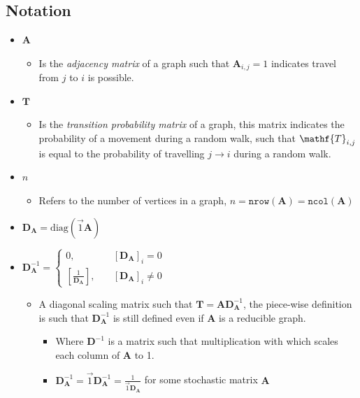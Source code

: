 \documentclass[11pt]{report}
\begin{document}
\subsection{Notation}
\label{notation}
\begin{itemize}
\item \(\mathbf{A}\)
\begin{itemize}
\item Is the \emph{adjacency matrix} of a graph such that \(\mathbf{A}_{i,j} = 1\) indicates travel from \(j\) to \(i\) is possible.
\end{itemize}
\item \(\mathbf{T}\)
\begin{itemize}
\item Is the \emph{transition probability matrix} of a graph, this matrix indicates the probability of a movement during a random walk, such that \(\mathf{T}_{i,j}\) is equal to the probability of travelling \(j \rightarrow  i\) during a random walk.
\end{itemize}
\item \(n\)
\begin{itemize}
\item Refers to the number of vertices in a graph, \(n = \mathtt{nrow}\left(\mathbf{A}\right) = \mathtt{ncol}\left(\mathbf{A}\right)\)
\end{itemize}
\item \(\mathbf{D}_{\mathbf{A}}=\mathrm{diag}\left(\vec{1}\mathbf{A}\right)\)
\item \(\mathbf{D}_{\mathbf{A}}^{- 1}  =
   \begin{cases}
   0 ,& \quad \left[ \mathbf{D}_{\mathbf{A}} \right]_i = 0 \\
   \left[ \frac{1}{\mathbf{D}_{\mathbf{A}}} \right] ,& \enspace \enspace \left[ \mathbf{D}_{\mathbf{A}} \right]_i \neq 0
   \end{cases}\)
\begin{itemize}
\item A diagonal scaling matrix such that \(\mathbf{T} = \mathbf{A} \mathbf{D}_{\mathbf{A}}^{-1}\), the piece-wise definition is such that \(\mathbf{D}^{-1}_{\mathbf{A}}\) is still defined even if \(\mathbf{A}\) is a reducible graph.
\begin{itemize}
\item Where \(\mathbf{D}^{-1}\) is a matrix such that multiplication with which scales each column of \(\mathbf{A}\) to 1.
\item \(\mathbf{D}^{-1}_{\mathbf{A}} = \vec{1}\mathbf{D}^{-1}_{\mathbf{A}} = \frac{1}{\vec{1}\mathbf{D}_{\mathbf{A}}}\) for some stochastic matrix \(\mathbf{A}\)

\end{itemize}
\end{itemize}
\end{itemize}
\end{document}

